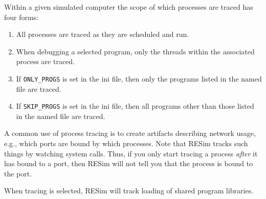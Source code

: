 \documentclass[titlepage]{article}
\begin{document}
Within a given simulated computer the scope of which processes are traced has four forms:
\begin{enumerate}
\item All processes are traced as they are scheduled and run.
\item When debugging a selected program, only the threads within the associated process are traced.
\item If {\tt ONLY\_PROGS} is set in the ini file, then only the programs listed in the named file are traced.
\item If {\tt SKIP\_PROGS} is set in the ini file, then all programs other than those listed in the named file are traced.
\end{enumerate}

A common use of process tracing is to create artifacts describing network usage, e.g., which ports are bound by which processes.  Note that RESim tracks
such things by watching system calls.  Thus, if you only start tracing a process \textit{after} it has bound to a port, then RESim will not tell you that
the process is bound to the port.

When tracing is selected, RESim will track loading of shared program libraries.
\end{document}
